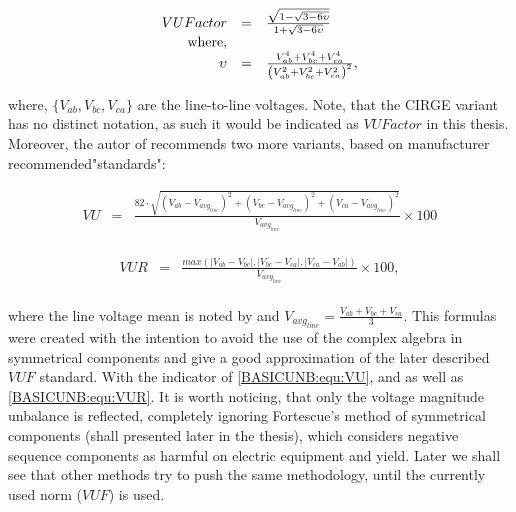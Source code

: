 	\begin{equation}
        \begin{array}{rcl}
            VUFactor&=&\frac{\sqrt{{1-\sqrt{3-6\upsilon}}}}{1+\sqrt{3-6\upsilon}}\\
						\textnormal{where},&&\\
						\upsilon&=&\frac{V_{ab}^4+V_{bc}^4+V_{ca}^4}{\left(V_{ab}^2+V_{bc}^2+V_{ca}^2\right)^2},					
        \end{array}
        \label{BASICUNB:equ:CIRGE}
    \end{equation}
		
		where, $\{V_{ab},V_{bc},V_{ca}\}$ are the line-to-line voltages. Note, that the CIRGE variant has no distinct notation, as such it would be indicated as $VUFactor$ in this thesis. Moreover, the autor of \cite{robert1992assessing} recommends two more variants, based on manufacturer recommended"standards": 
		
		\begin{equation}
        \begin{array}{rcl}
            VU&=&\frac{82\cdot\sqrt{(V_{ab}-V_{avg_{line}})^2+(V_{bc}-V_{avg_{line}})^2+(V_{ca}-V_{avg_{line}})^2}}{V_{avg_{line}}}\times100\\					
        \end{array}
        \label{BASICUNB:equ:VU}
    \end{equation}
		
		\begin{equation}
        \begin{array}{rcl}
            VUR&=&\frac{max\left( |V_{ab}-V_{bc}|,|V_{bc}-V_{ca}|,|V_{ca}-V_{ab}| \right)}{V_{avg_{line}}}\times100,\\				
        \end{array}
        \label{BASICUNB:equ:VUR}
    \end{equation}
		
		where the line voltage mean is noted by and $V_{avg_{line}}=\frac{V_{ab}+V_{bc}+V_{ca}}{3}$.
		This formulas were created with the intention to avoid the use of the complex algebra in symmetrical components and give
a good approximation of the later described $VUF$ standard. With the indicator of \ref{BASICUNB:equ:VU}, and as well as \ref{BASICUNB:equ:VUR}. It is worth noticing, that only the voltage magnitude unbalance is reflected, completely ignoring Fortescue's method of symmetrical components \cite{fortescue1918method} (shall presented later in the thesis), which considers negative sequence components as harmful on electric equipment and yield. Later we shall see that other methods try to push the same methodology, until the currently used norm ($VUF$) is used.

